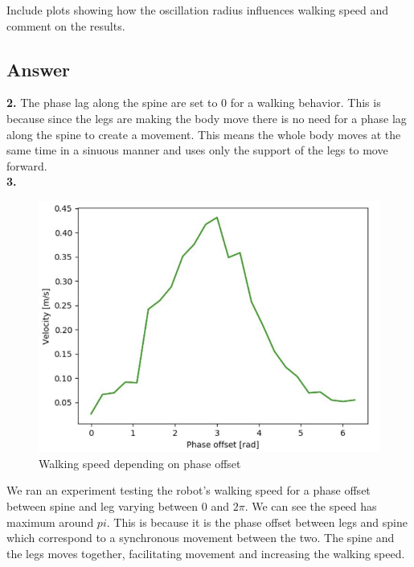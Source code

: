 \documentclass{cmc}
\begin{document}
Include plots showing how the oscillation radius influences walking speed and
comment on the results.



\subsection*{Answer}


\textbf{2.} The phase lag along the spine are set to 0 for a walking behavior. This is because since the legs are making the body move there is no need for a phase lag along the spine to create a movement. This means the whole body moves at the same time in a sinuous manner and uses only the support of the legs to move forward. \\

\textbf{3.}  
\begin{figure}[H]
\centering
\includegraphics[scale=0.7]{9f_3.JPG}
\caption{Walking speed depending on phase offset}
\label{fig:9f3}
\end{figure}

We ran an experiment testing the robot's walking speed for a phase offset between spine and leg varying between $0$ and $2\pi$. We can see the speed has maximum around $pi$. This is because it is the phase offset between legs and spine which correspond to a synchronous movement between the two. The spine and the legs moves together, facilitating movement and increasing the walking speed. \\
\end{document}
